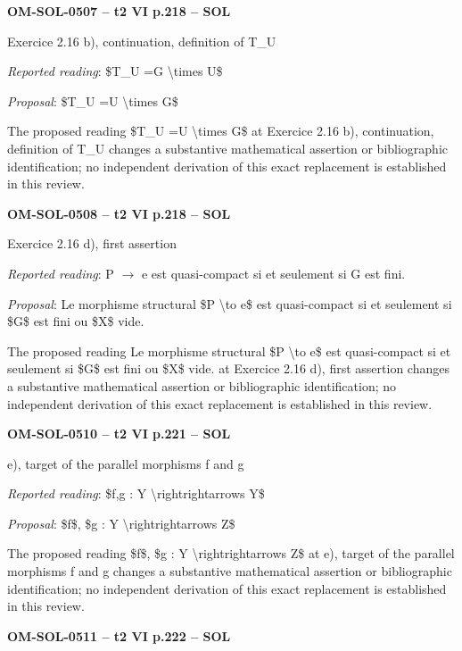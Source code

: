 \par\noindent\textbf{OM-SOL-0507 -- t2 VI p.218 -- SOL}\par
Exercice 2.16 b), continuation, definition of T\_U\par
\emph{Reported reading}: \$T\_U =\allowbreak  G \textbackslash{}times U\$\par
\emph{Proposal}: \$T\_U =\allowbreak  U \textbackslash{}times G\$\par
The proposed reading \$T\_U =\allowbreak  U \textbackslash{}times G\$ at Exercice 2.16 b), continuation, definition of T\_U changes a substantive mathematical assertion or bibliographic identification; no independent derivation of this exact replacement is established in this review.\par
\par\noindent\textbf{OM-SOL-0508 -- t2 VI p.218 -- SOL}\par
Exercice 2.16 d), first assertion\par
\emph{Reported reading}: P \ensuremath{\to} e est quasi-compact si et seulement si G est fini.\par
\emph{Proposal}: Le morphisme structural \$P \textbackslash{}to e\$ est quasi-compact si et seulement si \$G\$ est fini ou \$X\$ vide.\par
The proposed reading Le morphisme structural \$P \textbackslash{}to e\$ est quasi-compact si et seulement si \$G\$ est fini ou \$X\$ vide. at Exercice 2.16 d), first assertion changes a substantive mathematical assertion or bibliographic identification; no independent derivation of this exact replacement is established in this review.\par
\par\noindent\textbf{OM-SOL-0510 -- t2 VI p.221 -- SOL}\par
e), target of the parallel morphisms f and g\par
\emph{Reported reading}: \$f,g : Y \textbackslash{}rightrightarrows Y\$\par
\emph{Proposal}: \$f\$, \$g : Y \textbackslash{}rightrightarrows Z\$\par
The proposed reading \$f\$, \$g : Y \textbackslash{}rightrightarrows Z\$ at e), target of the parallel morphisms f and g changes a substantive mathematical assertion or bibliographic identification; no independent derivation of this exact replacement is established in this review.\par
\par\noindent\textbf{OM-SOL-0511 -- t2 VI p.222 -- SOL}\par
